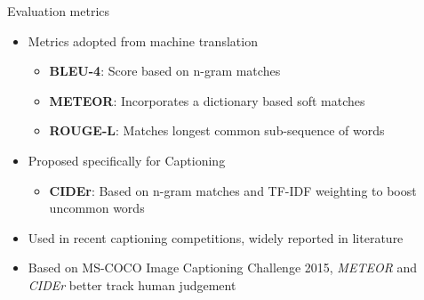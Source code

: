 \documentclass{beamer}
\begin{document}
\begin{frame}{Evaluation metrics}
\begin{itemize}
    \item Metrics adopted from machine translation 
       \begin{itemize}
           \item \textbf{BLEU-4}: Score based on n-gram matches
           \item \textbf{METEOR}: Incorporates a dictionary based soft matches
           \item \textbf{ROUGE-L}: Matches longest common sub-sequence of words 
       \end{itemize}
    \item Proposed specifically for Captioning 
       \begin{itemize}
           \item \textbf{CIDEr}: Based on n-gram matches and TF-IDF weighting to boost uncommon words
       \end{itemize}
    \item Used in recent captioning competitions, widely reported in literature 
    \item Based on MS-COCO Image Captioning Challenge 2015, \emph{METEOR} and \emph{CIDEr} better track human judgement
\end{itemize}
\end{frame}
\end{document}
